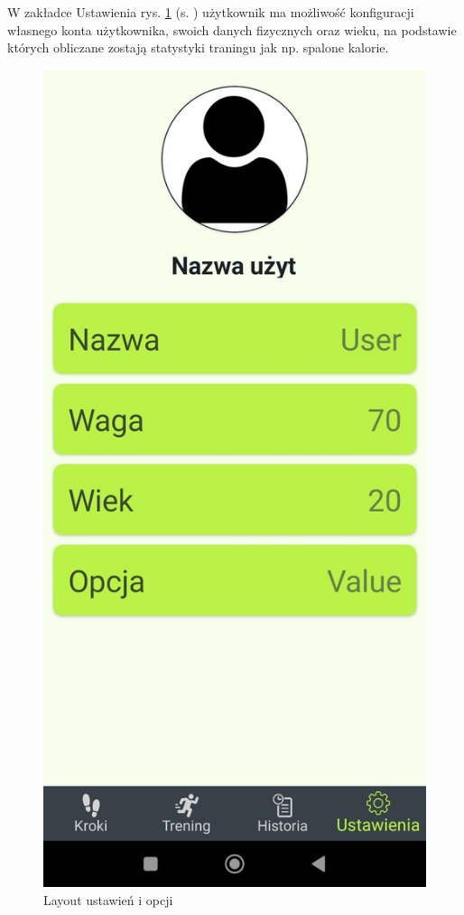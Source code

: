 \hspace{0.60cm}W zakładce Ustawienia rys. \ref{rys:rysunek001e} (s. \pageref{rys:rysunek001e}) użytkownik ma możliwość konfiguracji własnego konta użytkownika, swoich danych fizycznych oraz wieku, na podstawie których obliczane zostają statystyki traningu jak np. spalone kalorie.

\begin{figure}[!htb]
	\centering
	\includegraphics[width=.2\linewidth]{rys/ustawienia2.jpg}
	\caption{Layout ustawień i opcji}
	\label{rys:rysunek001e}
\end{figure}